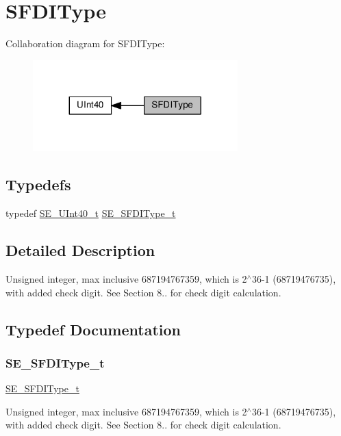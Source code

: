 \hypertarget{group__SFDIType}{}\section{S\+F\+D\+I\+Type}
\label{group__SFDIType}
Collaboration diagram for S\+F\+D\+I\+Type\+:\nopagebreak
\begin{figure}[H]
\begin{center}
\leavevmode
\includegraphics[width=224pt]{group__SFDIType}
\end{center}
\end{figure}
\subsection*{Typedefs}
\begin{DoxyCompactItemize}
\item 
typedef \hyperlink{group__UInt40_ga918cbd196341a025cebbfa392d221ab7}{S\+E\+\_\+\+U\+Int40\+\_\+t} \hyperlink{group__SFDIType_ga08ad209b3cfce51cbdc450d1d35a1045}{S\+E\+\_\+\+S\+F\+D\+I\+Type\+\_\+t}
\end{DoxyCompactItemize}


\subsection{Detailed Description}
Unsigned integer, max inclusive 687194767359, which is 2$^\wedge$36-\/1 (68719476735), with added check digit. See Section 8.. for check digit calculation. 

\subsection{Typedef Documentation}
\mbox{\label{group__SFDIType_ga08ad209b3cfce51cbdc450d1d35a1045}} 
\subsubsection{\texorpdfstring{S\+E\+\_\+\+S\+F\+D\+I\+Type\+\_\+t}{SE\_SFDIType\_t}}
{\footnotesize\ttfamily \hyperlink{group__SFDIType_ga08ad209b3cfce51cbdc450d1d35a1045}{S\+E\+\_\+\+S\+F\+D\+I\+Type\+\_\+t}}

Unsigned integer, max inclusive 687194767359, which is 2$^\wedge$36-\/1 (68719476735), with added check digit. See Section 8.. for check digit calculation. 